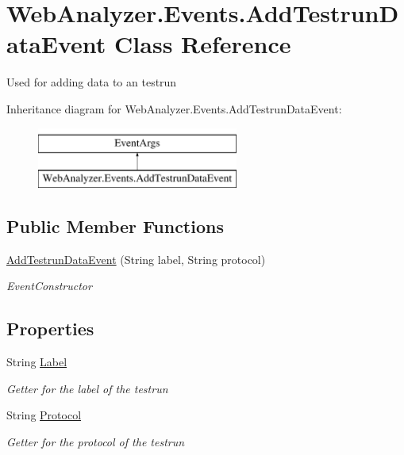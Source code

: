 \hypertarget{class_web_analyzer_1_1_events_1_1_add_testrun_data_event}{}\section{Web\+Analyzer.\+Events.\+Add\+Testrun\+Data\+Event Class Reference}
\label{class_web_analyzer_1_1_events_1_1_add_testrun_data_event}


Used for adding data to an testrun  


Inheritance diagram for Web\+Analyzer.\+Events.\+Add\+Testrun\+Data\+Event\+:\begin{figure}[H]
\begin{center}
\leavevmode
\includegraphics[height=2.000000cm]{class_web_analyzer_1_1_events_1_1_add_testrun_data_event}
\end{center}
\end{figure}
\subsection*{Public Member Functions}
\begin{DoxyCompactItemize}
\item 
\hyperlink{class_web_analyzer_1_1_events_1_1_add_testrun_data_event_a9d7e48f29516ecc0e2ce3a333587aac1}{Add\+Testrun\+Data\+Event} (String label, String protocol)
\begin{DoxyCompactList}\small\item\em Event\+Constructor \end{DoxyCompactList}\end{DoxyCompactItemize}
\subsection*{Properties}
\begin{DoxyCompactItemize}
\item 
String \hyperlink{class_web_analyzer_1_1_events_1_1_add_testrun_data_event_a6aab7122ffe1cd59d54c108afdc13969}{Label}
\begin{DoxyCompactList}\small\item\em Getter for the label of the testrun \end{DoxyCompactList}\item 
String \hyperlink{class_web_analyzer_1_1_events_1_1_add_testrun_data_event_a515231faaeba712dfe83b3e8ee1a38eb}{Protocol}
\begin{DoxyCompactList}\small\item\em Getter for the protocol of the testrun \end{DoxyCompactList}\end{DoxyCompactItemize}
